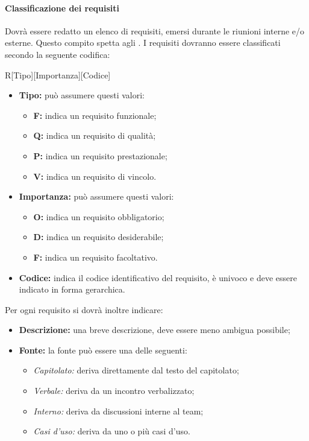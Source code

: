 \paragraph{Classificazione dei requisiti}
Dovrà essere redatto un elenco di requisiti, emersi durante le riunioni interne 
e/o esterne. Questo compito spetta agli \textit{\Anas}. I requisiti dovranno 
essere classificati secondo la seguente codifica:
\begin{center}
R[Tipo][Importanza][Codice]
\end{center}
\begin{itemize} 
  \item \textbf{Tipo:} può assumere questi valori:
  \begin{itemize}
    \item \textbf{F:} indica un requisito funzionale;
    \item \textbf{Q:} indica un requisito di qualità;
    \item \textbf{P:} indica un requisito prestazionale;
    \item \textbf{V:} indica un requisito di vincolo.
  \end{itemize}
  \item \textbf{Importanza:} può assumere questi valori:
  \begin{itemize}
    \item \textbf{O:} indica un requisito obbligatorio;
    \item \textbf{D:} indica un requisito desiderabile;
    \item \textbf{F:} indica un requisito facoltativo.
  \end{itemize}
  \item \textbf{Codice:} indica il codice identificativo del requisito, è 
  univoco e deve essere indicato in forma gerarchica.
\end{itemize}
Per ogni requisito si dovrà inoltre indicare: 
\begin{itemize}
  \item \textbf{Descrizione:} una breve descrizione, deve essere meno ambigua possibile;
  \item \textbf{Fonte:} la fonte può essere una delle seguenti:
  \begin{itemize}
    \item \textit{Capitolato:} deriva direttamente dal testo del capitolato;
    \item \textit{Verbale:} deriva da un incontro verbalizzato;
    \item \textit{Interno:} deriva da discussioni interne al team;
    \item \textit{Casi d'uso:} deriva da uno o più casi d'uso.
  \end{itemize}
\end{itemize} 
